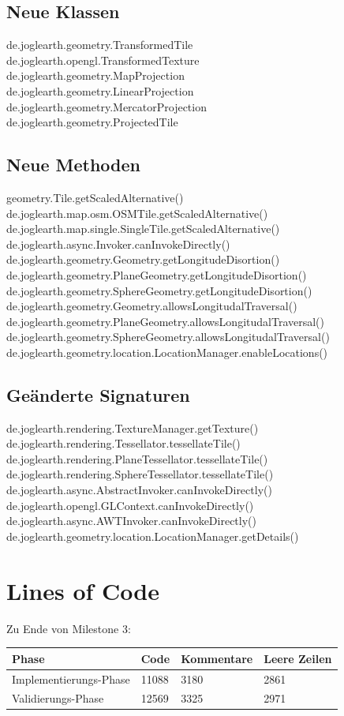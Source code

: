 \documentclass[10pt]{scrreprt}
\begin{document}
\section{Neue Klassen}
de.joglearth.geometry.TransformedTile\\
de.joglearth.opengl.TransformedTexture\\
de.joglearth.geometry.MapProjection\\
de.joglearth.geometry.LinearProjection\\
de.joglearth.geometry.MercatorProjection\\
de.joglearth.geometry.ProjectedTile\\
\section{Neue Methoden}
geometry.Tile.getScaledAlternative()\\
de.joglearth.map.osm.OSMTile.getScaledAlternative()\\
de.joglearth.map.single.SingleTile.getScaledAlternative()\\
de.joglearth.async.Invoker.canInvokeDirectly()\\
de.joglearth.geometry.Geometry.getLongitudeDisortion()\\
de.joglearth.geometry.PlaneGeometry.getLongitudeDisortion()\\
de.joglearth.geometry.SphereGeometry.getLongitudeDisortion()\\
de.joglearth.geometry.Geometry.allowsLongitudalTraversal()\\
de.joglearth.geometry.PlaneGeometry.allowsLongitudalTraversal()\\
de.joglearth.geometry.SphereGeometry.allowsLongitudalTraversal()\\
de.joglearth.geometry.location.LocationManager.enableLocations()\\
\section{Geänderte Signaturen}
de.joglearth.rendering.TextureManager.getTexture()\\
de.joglearth.rendering.Tessellator.tessellateTile()\\
de.joglearth.rendering.PlaneTessellator.tessellateTile()\\
de.joglearth.rendering.SphereTessellator.tessellateTile()\\
de.joglearth.async.AbstractInvoker.canInvokeDirectly()\\
de.joglearth.opengl.GLContext.canInvokeDirectly()\\
de.joglearth.async.AWTInvoker.canInvokeDirectly()\\
de.joglearth.geometry.location.LocationManager.getDetails()\\


\chapter{Lines of Code}
Zu Ende von Milestone 3:
\begin{longtable}{|l|p{}|p{}|p{}|}
\hline
Phase & Code & Kommentare & Leere Zeilen\\
\hline
\hline
Implementierungs-Phase & 11088 & 3180 & 2861 \\
\hline
Validierungs-Phase & 12569 & 3325 & 2971 \\
\hline
\end{longtable}
\end{document}
